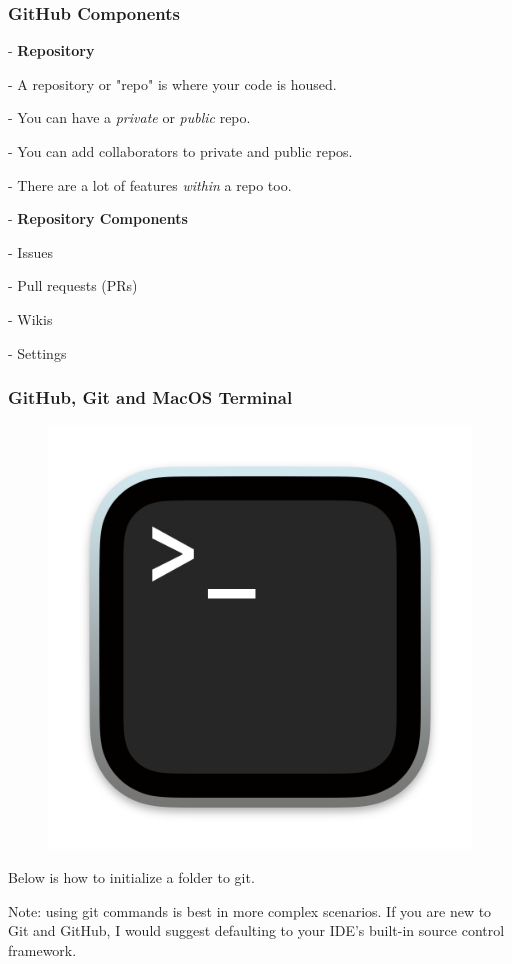 \documentclass{beamer}
\begin{document}
\begin{frame}
\frametitle{GitHub Components}

- \textbf{Repository}

\hspace{10mm} - A repository or "repo" is where your code is housed.

\hspace{10mm} - You can have a \textit{private} or \textit{public} repo.

\hspace{10mm} - You can add collaborators to private and public repos.

\hspace{10mm} - There are a lot of features \textit{within} a repo too.

- \textbf{Repository Components}

\hspace{10mm} - Issues

\hspace{10mm} - Pull requests (PRs)

\hspace{10mm} - Wikis

\hspace{10mm} - Settings

\end{frame}

\begin{frame}
\frametitle{GitHub, Git and MacOS Terminal}

\begin{figure}[t]
\includegraphics[scale=0.1]{images/macterm.png}
\end{figure}

Below is how to initialize a folder to git.



\tiny Note: using git commands is best in more complex scenarios. If you are new to Git and GitHub, I would suggest defaulting to your IDE's built-in source control framework.
\end{frame}
\end{document}
